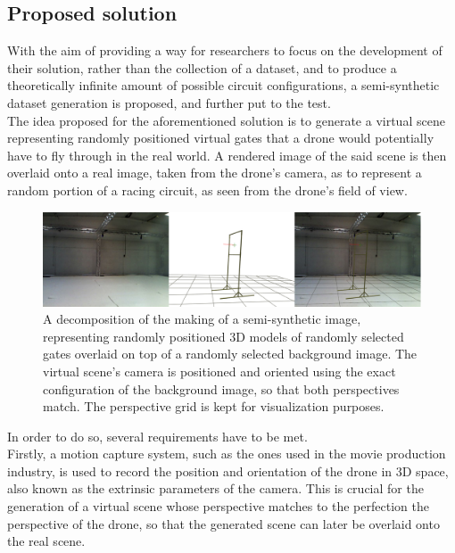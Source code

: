 \subsection{Proposed solution}

With the aim of providing a way for researchers to focus on the development of
their solution, rather than the collection of a dataset, and to produce a
theoretically infinite amount of possible circuit configurations, a
semi-synthetic dataset generation is proposed, and further put to the test.\\

The idea proposed for the aforementioned solution is to generate a virtual
scene representing randomly positioned virtual gates that a drone would
potentially have to fly through in the real world. A rendered image of the said
scene is then overlaid onto a real image, taken from the drone's camera, as to
represent a random portion of a racing circuit, as seen from the drone's field
of view. 

\begin{figure}[h]
	\center
	\includegraphics[width=\textwidth]{figure/dataset_solution.png}
	\caption[The steps of a semi-synthetic image generation.]{A decomposition
	of the making of a semi-synthetic image, representing randomly positioned
	3D models of randomly selected gates overlaid on top of a randomly selected
	background image. The virtual scene's camera is positioned and oriented
	using the exact configuration of the background image, so that both
	perspectives match. The perspective grid is kept for visualization
	purposes.}
\end{figure}

In order to do so, several requirements have to be met.\\

Firstly, a motion capture system, such as the ones used in the movie production
industry, is used to record the position and orientation of the drone in 3D
space, also known as the extrinsic parameters of the camera. This is crucial
for the generation of a virtual scene whose perspective matches to the
perfection the perspective of the drone, so that the generated scene can later
be overlaid onto the real scene.

